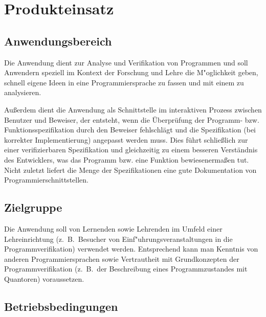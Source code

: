 \section{Produkteinsatz}%

\subsection{Anwendungsbereich}%

Die Anwendung dient zur Analyse und Verifikation von Programmen und soll Anwendern speziell im Kontext der Forschung und Lehre die M"oglichkeit geben, schnell eigene Ideen in eine Programmiersprache zu fassen und mit einem  zu analysieren.%

Außerdem dient die Anwendung als Schnittstelle im interaktiven Prozess zwischen Benutzer und Beweiser, der entsteht, wenn die Überprüfung der Programm- bzw. Funktionsspezifikation durch den Beweiser fehlschlägt und die Spezifikation (bei korrekter Implementierung) angepasst werden muss. Dies führt schließlich zur einer verifizierbaren Spezifikation und gleichzeitig zu einem besseren Verständnis des Entwicklers, was das Programm bzw. eine Funktion bewiesenermaßen tut. Nicht zuletzt liefert die Menge der Spezifikationen eine gute Dokumentation von Programmierschnittstellen.%

\subsection{Zielgruppe}%

Die Anwendung soll von Lernenden sowie Lehrenden im Umfeld einer Lehreinrichtung (z.~B.\ Besucher von Einf"uhrungsveranstaltungen in die Programmverifikation) verwendet werden. Entsprechend kann man Kenntnis von anderen Programmiersprachen sowie Vertrautheit mit Grundkonzepten der Programmverifikation (z.~B.\ der Beschreibung eines Programmzustandes mit Quantoren) voraussetzen.%

\subsection{Betriebsbedingungen}%

